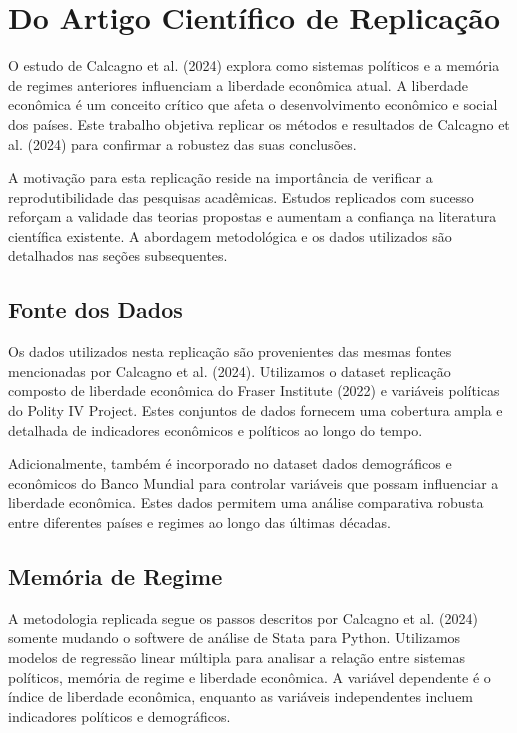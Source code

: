 


\chapter{Do Artigo Científico de Replicação}

O estudo de Calcagno et al. (2024) explora como sistemas políticos e a memória de regimes anteriores influenciam a liberdade econômica atual. A liberdade econômica é um conceito crítico que afeta o desenvolvimento econômico e social dos países. Este trabalho objetiva replicar os métodos e resultados de Calcagno et al. (2024) para confirmar a robustez das suas conclusões.

A motivação para esta replicação reside na importância de verificar a reprodutibilidade das pesquisas acadêmicas. Estudos replicados com sucesso reforçam a validade das teorias propostas e aumentam a confiança na literatura científica existente. A abordagem metodológica e os dados utilizados são detalhados nas seções subsequentes.


\section{Fonte dos Dados}
Os dados utilizados nesta replicação são provenientes das mesmas fontes mencionadas por Calcagno et al. (2024). Utilizamos o dataset replicação composto de liberdade econômica do Fraser Institute (2022) e variáveis políticas do Polity IV Project. Estes conjuntos de dados fornecem uma cobertura ampla e detalhada de indicadores econômicos e políticos ao longo do tempo.

Adicionalmente, também é incorporado no dataset dados demográficos e econômicos do Banco Mundial para controlar variáveis que possam influenciar a liberdade econômica. Estes dados permitem uma análise comparativa robusta entre diferentes países e regimes ao longo das últimas décadas.

\section{Memória de Regime}
A metodologia replicada segue os passos descritos por Calcagno et al. (2024) somente mudando o softwere de análise de Stata para Python. Utilizamos modelos de regressão linear múltipla para analisar a relação entre sistemas políticos, memória de regime e liberdade econômica. A variável dependente é o índice de liberdade econômica, enquanto as variáveis independentes incluem indicadores políticos e demográficos.

